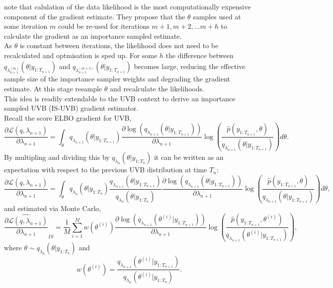 \documentclass[
12pt, %
onehalfspacing, %
nohyperref, %
headsepline, %
chapterinoneline, %
]{MastersDoctoralThesis} %
\begin{document}
\citet{Sakaya2017} note that calulation of the data likelihood is the most computationally expensive component of the gradient estimate. They propose that the $\theta$ samples used at some iteration $m$ could be re-used for iterations $m + 1, m + 2, \ldots m + h$ to calculate the gradient as an importance sampled estimate. 
\\

As $\theta$ is constant between iterations, the likelihood does not need to be recalculated and optmisation is sped up. For some $h$ the difference between $q_{\lambda_{n+1}^{(m)}}(\theta | y_{1:T_{n+1}})$ and $q_{\lambda_{n+1}^{(m+h)}}(\theta | y_{1:T_{n+1}})$ becomes large, reducing the effective sample size of the importance sampler weights and degrading the gradient estimate. At this stage \citet{Sakaya2017} resample $\theta$ and recalculate the likelihoods.
\\

This idea is readily extendable to the UVB context to derive an importance sampled UVB (IS-UVB) gradient estimator.
\\

Recall the score ELBO gradient for UVB,
\begin{equation}
\label{UVBIS:scoreGrad}
\frac{\partial\mathcal{L}(q, \lambda_{n+1})}{\partial \lambda_{n+1}} = \int_{\theta} q_{\lambda_{n+1}}(\theta | y_{1:T_{n+1}}) \frac{\partial \log(q_{\lambda_{n+1}}(\theta | y_{1:T_{n+1}}))}{\partial \lambda_{n+1}} \log \left(\frac{\hat{p}(y_{1:T_{n+1}}, \theta)}{q_{\lambda_{n+1}}(\theta | y_{1:T_{n+1}})} \right) d\theta.
\end{equation}
By multipling and dividing this by $q_{\lambda_n}(\theta | y_{1:T_n})$ it can be written as an expectation with respect to the previous UVB distribution at time $T_n$:
\begin{equation}
\label{UVBIS:scoreGradIS}
\frac{\partial\mathcal{L}(q, \lambda_{n+1})}{\partial \lambda_{n+1}} = \int_{\theta} q_{\lambda_{n}}(\theta | y_{1:T_{n}})\frac{q_{\lambda_{n+1}}(\theta | y_{1:T_{n+1}})}{q_{\lambda_{n}}(\theta | y_{1:T_{n}})} \frac{\partial \log(q_{\lambda_{n+1}}(\theta | y_{1:T_{n+1}}))}{\partial \lambda_{n+1}} \log \left(\frac{\hat{p}(y_{1:T_{n+1}}, \theta)}{q_{\lambda_{n+1}}(\theta | y_{1:T_{n+1}})} \right) d\theta,
\end{equation}
and estimated via Monte Carlo,
\begin{equation}
\label{UVBIS:scoreEstIS}
\widehat{\frac{\partial\mathcal{L}(q, \lambda_{n+1})}{\partial \lambda_{n+1}}}_{IS} = \frac{1}{M} \sum_{i=1}^M w(\theta^{(i)})\frac{\partial \log(q_{\lambda_{n+1}}(\theta^{(i)} | y_{1:T_{n+1}}))}{\partial \lambda_{n+1}} \log \left(\frac{\hat{p}(y_{1:T_{n+1}}, \theta^{(i)})}{q_{\lambda_{n+1}}(\theta^{(i)} | y_{1:T_{n+1}})} \right),
\end{equation}
where $\theta \sim q_{\lambda_{n}}(\theta | y_{1:{T_n}})$ and 
\begin{equation}
w(\theta^{(i)}) = \frac{q_{\lambda_{n+1}}(\theta^{(i)} | y_{1:T_{n+1}})}{q_{\lambda_{n}}(\theta^{(i)} | y_{1:T_{n}})}.
\end{equation}
\end{document}

